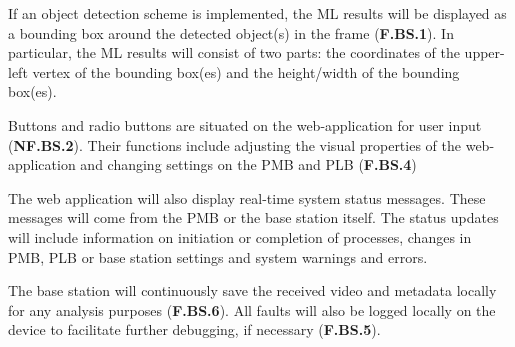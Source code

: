 If an object detection scheme is implemented, the ML results will be displayed as a bounding box around the detected object(s) in the frame (\textbf{F.BS.1}). In particular, the ML results will consist of two parts: the coordinates of the upper-left vertex of the bounding box(es) and the height/width of the bounding box(es).

Buttons and radio buttons are situated on the web-application for user input (\textbf{NF.BS.2}). Their functions include adjusting the visual properties of the web-application and changing settings on the PMB and PLB (\textbf{F.BS.4})

The web application will also display real-time system status messages. These messages will come from the PMB or the base station itself. The status updates will include information on initiation or completion of processes, changes in PMB, PLB or base station settings and system warnings and errors.

The base station will continuously save the received video and metadata locally for any analysis purposes (\textbf{F.BS.6}). All faults will also be logged locally on the device to facilitate further debugging, if necessary (\textbf{F.BS.5}).


